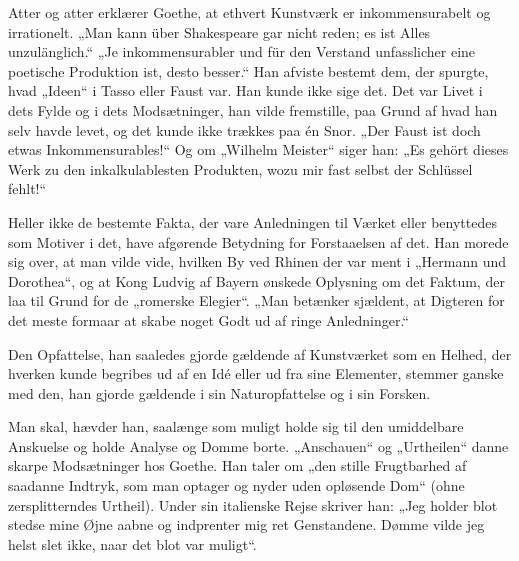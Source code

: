 \documentclass[12pt,a4paper,openany]{book}
\newcommand{\opage}[1]{\marginnote{\footnotesize\textit{[#1]}}}
\begin{document}
Atter og atter erklærer Goethe, at ethvert Kunstværk er
inkommensurabelt og irrationelt. „Man kann über Shakespeare
gar nicht reden; es ist Alles unzulänglich.“ „Je inkommensurabler
und für den Verstand unfasslicher eine poetische Produktion
ist, desto besser.“ Han afviste bestemt dem, der spurgte,
hvad „Ideen“ i Tasso eller Faust var. Han kunde ikke sige
det. Det var Livet i dets Fylde og i dets Modsætninger, han
vilde fremstille, paa Grund af hvad han selv havde levet, og
det kunde ikke trækkes paa én Snor. „Der Faust ist doch etwas
Inkommensurables!“ Og om „Wilhelm Meister“ siger han:
„Es gehört dieses Werk zu den inkalkulablesten Produkten,
wozu mir fast selbst der Schlüssel fehlt!“

Heller ikke de bestemte Fakta, der vare Anledningen til
Værket eller benyttedes som Motiver i det, have afgørende Betydning
for Forstaaelsen af det. Han morede sig over, at man
vilde vide, hvilken By ved Rhinen der var ment i „Hermann
und Dorothea“, og at Kong Ludvig af Bayern ønskede Oplysning
om det Faktum, der laa til Grund for de „romerske Elegier“.
„Man betænker sjældent, at Digteren for det meste formaar
at skabe noget Godt ud af ringe Anledninger.“

Den Opfattelse, han saaledes gjorde gældende af Kunstværket
som en Helhed, der hverken kunde begribes ud af en
Idé eller ud fra sine Elementer, stemmer ganske med den, han
gjorde gældende i sin Naturopfattelse og i sin Forsken.

Man skal, hævder han, saalænge som muligt holde sig til
den umiddelbare Anskuelse og holde Analyse og Domme borte.
„Anschauen“ og „Urtheilen“ danne skarpe Modsætninger hos
Goethe. Han taler om „den stille Frugtbarhed af saadanne Indtryk,
som man optager og nyder uden opløsende Dom“ (ohne
zersplitterndes Urtheil). Under sin italienske Rejse skriver han:
\setcounter{footnote}{0}%
\opage{171}„Jeg holder blot stedse mine Øjne aabne og indprenter mig
ret Genstandene. Dømme vilde jeg helst slet ikke, naar det
blot var muligt“.
\end{document}

